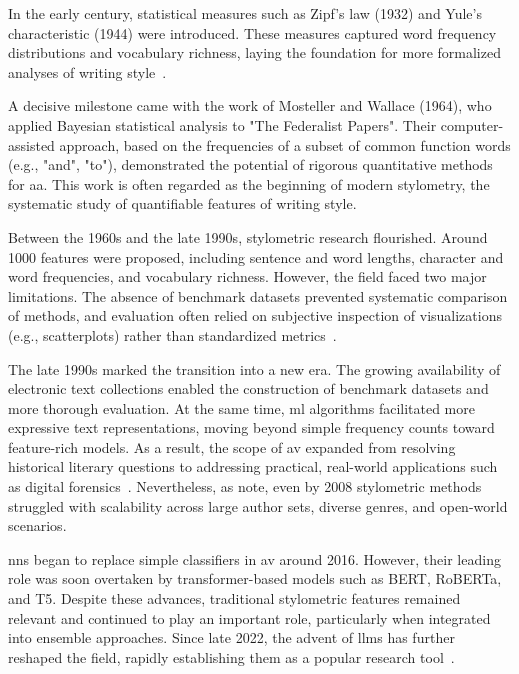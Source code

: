 
In the early  century, statistical measures such as Zipf's law (1932) and Yule's characteristic (1944) were introduced. 
These measures captured word frequency distributions and vocabulary richness, laying the foundation for more formalized analyses of writing style~\citep{neal_surveying_2018,stamatatos_survey_2009}.

A decisive milestone came with the work of Mosteller and Wallace (1964), who applied Bayesian statistical analysis to "The Federalist Papers".
Their computer-assisted approach, based on the frequencies of a subset of common function words (e.g., "and", "to"), demonstrated the potential of rigorous quantitative methods for \ac{aa}. 
This work is often regarded as the beginning of modern stylometry, the systematic study of quantifiable features of writing style.

Between the 1960s and the late 1990s, stylometric research flourished.
Around \num{1000} features were proposed, including sentence and word lengths, character and word frequencies, and vocabulary richness. 
However, the field faced two major limitations. 
The absence of benchmark datasets prevented systematic comparison of methods, and evaluation often relied on subjective inspection of visualizations (e.g., scatterplots) rather than standardized metrics~\citep{stamatatos_survey_2009}.

The late 1990s marked the transition into a new era. 
The growing availability of electronic text collections enabled the construction of benchmark datasets and more thorough evaluation. 
At the same time, \ac{ml} algorithms facilitated more expressive text representations, moving beyond simple frequency counts toward feature-rich models. 
As a result, the scope of \ac{av} expanded from resolving historical literary questions to addressing practical, real-world applications such as digital forensics~\citep{stamatatos_survey_2009}. 
Nevertheless, as \citet{abbasi_writeprints_2008} note, even by 2008 stylometric methods struggled with scalability across large author sets, diverse genres, and open-world scenarios.

\acp{nn} began to replace simple classifiers in \ac{av} around 2016. 
However, their leading role was soon overtaken by transformer-based models such as BERT, RoBERTa, and T5. 
Despite these advances, traditional stylometric features remained relevant and continued to play an important role, particularly when integrated into ensemble approaches. 
Since late 2022, the advent of \acp{llm} has further reshaped the field, rapidly establishing them as a popular research tool~\citep{schmidt_llm_av_latin_24}.
